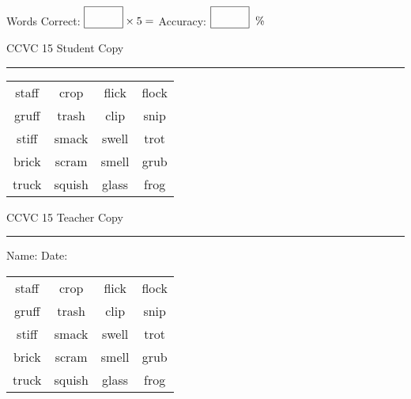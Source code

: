 \documentclass{memoir}
\begin{document}
\normalsize

Words Correct: $\fbox{\phantom{\huge 100}} \times 5 = $ Accuracy: $\fbox{\phantom{\huge 100}}\;\; \%$ 

\vfill

\newpage


\footnotesize \noindent
CCVC 15 \hfill Student Copy
\smallskip
\hrule

\Large

\setlength{\tabcolsep}{14pt}
\def\arraystretch{3}

{\selectfont


\begin{vplace}[0.5]
\begin{center}
\begin{tabular}{cccc}
staff            & crop & flick            & flock \\
gruff & trash & clip & snip \\
stiff & smack & swell & trot \\
brick       & scram & smell & grub \\
truck & squish & glass & frog \\
\end{tabular}
\end{center}
\end{vplace}

}

\newpage

\footnotesize \noindent
CCVC 15 \hfill Teacher Copy
\smallskip
\hrule

\normalsize

\vfill

\noindent
Name: \underline{\hspace{1.75in}} \hfill Date: \underline{\hspace{1in}}

\Large

{\selectfont


\begin{vplace}[0.5]
\begin{center}
\begin{tabular}{cccc}
staff            & crop & flick            & flock \\
gruff & trash & clip & snip \\
stiff & smack & swell & trot \\
brick       & scram & smell & grub \\
truck & squish & glass & frog \\
\end{tabular}
\end{center}
\end{vplace}



}
\end{document}
